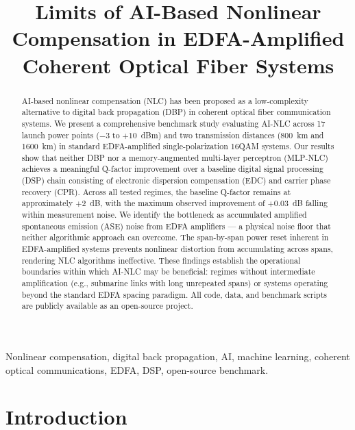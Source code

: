 \documentclass[conference]{IEEEtran}
\begin{document}
\title{Limits of AI-Based Nonlinear Compensation in EDFA-Amplified Coherent Optical Fiber Systems}

\author{
}

\maketitle

\begin{abstract}
AI-based nonlinear compensation (NLC) has been proposed as a low-complexity alternative to digital back propagation (DBP) in coherent optical fiber communication systems. We present a comprehensive benchmark study evaluating AI-NLC across 17 launch power points ($-3$ to $+10$~dBm) and two transmission distances (800~km and 1600~km) in standard EDFA-amplified single-polarization 16QAM systems. Our results show that neither DBP nor a memory-augmented multi-layer perceptron (MLP-NLC) achieves a meaningful Q-factor improvement over a baseline digital signal processing (DSP) chain consisting of electronic dispersion compensation (EDC) and carrier phase recovery (CPR). Across all tested regimes, the baseline Q-factor remains at approximately $+2$~dB, with the maximum observed improvement of $+0.03$~dB falling within measurement noise. We identify the bottleneck as accumulated amplified spontaneous emission (ASE) noise from EDFA amplifiers — a physical noise floor that neither algorithmic approach can overcome. The span-by-span power reset inherent in EDFA-amplified systems prevents nonlinear distortion from accumulating across spans, rendering NLC algorithms ineffective. These findings establish the operational boundaries within which AI-NLC may be beneficial: regimes without intermediate amplification (e.g., submarine links with long unrepeated spans) or systems operating beyond the standard EDFA spacing paradigm. All code, data, and benchmark scripts are publicly available as an open-source project.
\end{abstract}

\begin{IEEEkeywords}
Nonlinear compensation, digital back propagation, AI, machine learning, coherent optical communications, EDFA, DSP, open-source benchmark.
\end{IEEEkeywords}

\section{Introduction}
\end{document}
